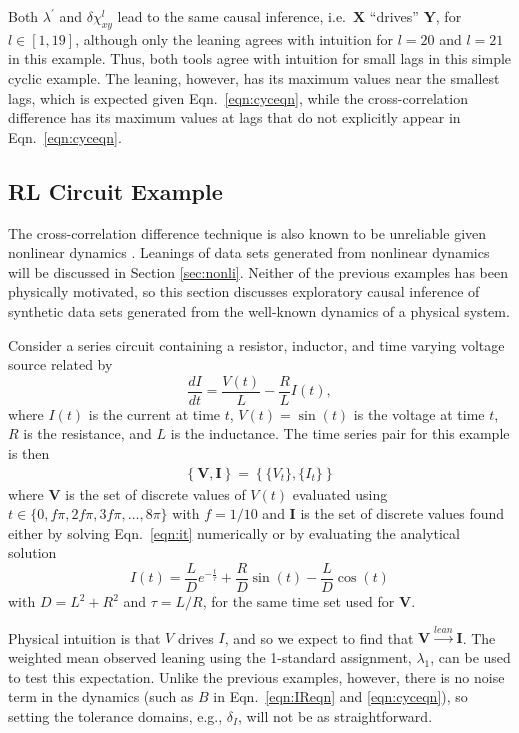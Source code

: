 \documentclass[twocolumn,aps,pre,groupedaddress]{revtex4-1}
\begin{document}
Both $\lambda^\prime$ and $\delta\chi_{xy}^l$ lead to the same causal inference, i.e.\ $\mathbf{X}$ ``drives'' $\mathbf{Y}$, for $l\in[1,19]$, although only the leaning agrees with intuition for $l=20$ and $l=21$ in this example.  Thus, both tools agree with intuition for small lags in this simple cyclic example.  The leaning, however, has its maximum values near the smallest lags, which is expected given Eqn.\ \ref{eqn:cyceqn}, while the cross-correlation difference has its maximum values at lags that do not explicitly appear in Eqn.\ \ref{eqn:cyceqn}.  

\subsection{RL Circuit Example}
\label{sec:rlcirc}

The cross-correlation difference technique is also known to be unreliable given nonlinear dynamics \cite{Rogosa1980}.  Leanings of data sets generated from nonlinear dynamics will be discussed in Section \ref{sec:nonli}.  Neither of the previous examples has been physically motivated, so this section discusses exploratory causal inference of synthetic data sets generated from the well-known dynamics of a physical system.

Consider a series circuit containing a resistor, inductor, and time varying voltage source related by
\begin{equation}
\label{eqn:it}
\frac{dI}{dt} = \frac{V(t)}{L} - \frac{R}{L} I(t),
\end{equation}
where $I(t)$ is the current at time $t$, $V(t)= \sin\left(t\right)$ is the voltage at time $t$, $R$ is the resistance, and $L$ is the inductance.  The time series pair for this example is then 
\begin{eqnarray}
\label{eqn:RLcirceqn}
\left\{\mathbf{V},\mathbf{I}\right\} = \left\{\{V_t\},\{I_t\}\right\}
\end{eqnarray}
where $\mathbf{V}$ is the set of discrete values of $V(t)$ evaluated using $t\in\{0,f\pi,2f\pi,3f\pi,\ldots,8\pi\}$ with $f=1/10$ and $\mathbf{I}$ is the set of discrete values found either by solving Eqn.\ \ref{eqn:it} numerically or by evaluating the analytical solution 
\begin{equation}
I(t) = \frac{L}{D}e^{-\frac{t}{\tau}}+\frac{R}{D}\sin(t)-\frac{L}{D}\cos(t)
\end{equation}
with $D = L^2 + R^2$ and $\tau = L/R$, for the same time set used for $\mathbf{V}$.

Physical intuition is that $V$ drives $I$, and so we expect to find that $\mathbf{V}\xrightarrow{lean}\mathbf{I}$.  The weighted mean observed leaning using the 1-standard assignment, $\lambda_1$, can be used to test this expectation.  Unlike the previous examples, however, there is no noise term in the dynamics (such as $B$ in Eqn.\ \ref{eqn:IReqn} and \ref{eqn:cyceqn}), so setting the tolerance domains, e.g., $\delta_I$, will not be as straightforward.  
\end{document}
